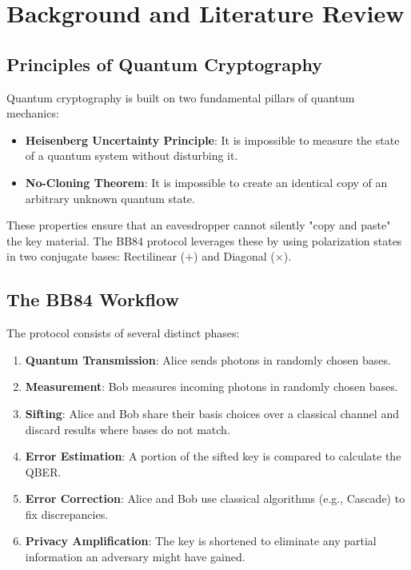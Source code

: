 \documentclass[journal,onecolumn,12pt,draftclsnofoot]{IEEEtran}
\begin{document}
\newpage

\section{Background and Literature Review}

\subsection{Principles of Quantum Cryptography}
Quantum cryptography is built on two fundamental pillars of quantum mechanics:
\begin{itemize}
    \item \textbf{Heisenberg Uncertainty Principle}: It is impossible to measure the state of a quantum system without disturbing it.
    \item \textbf{No-Cloning Theorem}: It is impossible to create an identical copy of an arbitrary unknown quantum state.
\end{itemize}
These properties ensure that an eavesdropper cannot silently "copy and paste" the key material. The BB84 protocol leverages these by using polarization states in two conjugate bases: Rectilinear ($+$) and Diagonal ($\times$).

\subsection{The BB84 Workflow}
The protocol consists of several distinct phases:
\begin{enumerate}
    \item \textbf{Quantum Transmission}: Alice sends photons in randomly chosen bases.
    \item \textbf{Measurement}: Bob measures incoming photons in randomly chosen bases.
    \item \textbf{Sifting}: Alice and Bob share their basis choices over a classical channel and discard results where bases do not match.
    \item \textbf{Error Estimation}: A portion of the sifted key is compared to calculate the QBER.
    \item \textbf{Error Correction}: Alice and Bob use classical algorithms (e.g., Cascade) to fix discrepancies.
    \item \textbf{Privacy Amplification}: The key is shortened to eliminate any partial information an adversary might have gained.
\end{enumerate}
\end{document}
